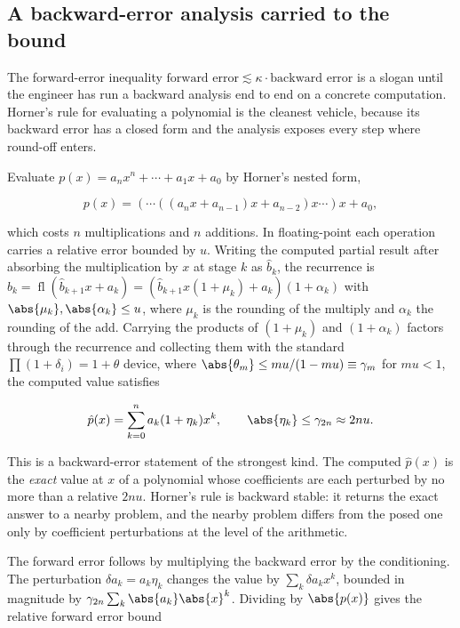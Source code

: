 \subsection{A backward-error analysis carried to the bound}

The forward-error inequality $\text{forward error} \lesssim \kappa \cdot
\text{backward error}$ is a slogan until the engineer has run a backward
analysis end to end on a concrete computation. Horner's rule for
evaluating a polynomial is the cleanest vehicle, because its backward
error has a closed form and the analysis exposes every step where round-off
enters.

Evaluate $p(x) = a_{n} x^{n} + \cdots + a_{1} x + a_{0}$ by Horner's
nested form,

\[
p(x) = (\cdots((a_{n} x + a_{n-1}) x + a_{n-2}) x \cdots) x + a_{0},
\]

which costs $n$ multiplications and $n$ additions. In floating-point each
operation carries a relative error bounded by $u$. Writing the computed
partial result after absorbing the multiplication by $x$ at stage $k$ as
$\hat{b}_{k}$, the recurrence is $\hat{b}_{k} = \operatorname{fl}
(\hat{b}_{k+1} x + a_{k}) = (\hat{b}_{k+1} x (1 + \mu_{k}) + a_{k})(1 +
\alpha_{k})$ with $\abs{\mu_{k}}, \abs{\alpha_{k}} \leq u$, where $\mu_{k}$
is the rounding of the multiply and $\alpha_{k}$ the rounding of the add.
Carrying the products of $(1 + \mu_{k})$ and $(1 + \alpha_{k})$ factors
through the recurrence and collecting them with the standard
$\prod(1 + \delta_{i}) = 1 + \theta$ device, where $\abs{\theta_{m}} \leq
m u / (1 - m u) \equiv \gamma_{m}$ for $m u < 1$, the computed value
satisfies

\[
\hat{p}(x) = \sum_{k=0}^{n} a_{k} (1 + \eta_{k}) x^{k},
\qquad \abs{\eta_{k}} \leq \gamma_{2n} \approx 2 n u.
\]

This is a backward-error statement of the strongest kind. The computed
$\hat{p}(x)$ is the \emph{exact} value at $x$ of a polynomial whose
coefficients are each perturbed by no more than a relative $2 n u$. Horner's
rule is backward stable: it returns the exact answer to a nearby problem,
and the nearby problem differs from the posed one only by coefficient
perturbations at the level of the arithmetic.

The forward error follows by multiplying the backward error by the
conditioning. The perturbation $\delta a_{k} = a_{k} \eta_{k}$ changes the
value by $\sum_{k} \delta a_{k} x^{k}$, bounded in magnitude by $\gamma_{2n}
\sum_{k} \abs{a_{k}} \abs{x}^{k}$. Dividing by $\abs{p(x)}$ gives the
relative forward error bound


